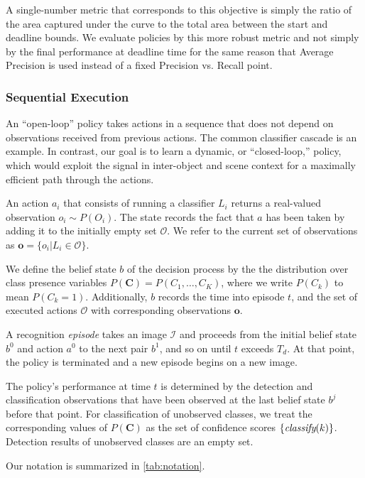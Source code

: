 A single-number metric that corresponds to this objective is simply the ratio of the area captured under the curve to the total area between the start and deadline bounds.
We evaluate policies by this more robust metric and not simply by the final performance at deadline time for the same reason that Average Precision is used instead of a fixed Precision vs. Recall point.

\subsubsection{Sequential Execution}
An ``open-loop'' policy takes actions in a sequence that does not depend on observations received from previous actions.
The common classifier cascade \cite{Viola2001} is an example.
In contrast, our goal is to learn a dynamic, or ``closed-loop,'' policy, which would exploit the signal in inter-object and scene context for a maximally efficient path through the actions.

An action $a_i$ that consists of running a classifier $L_i$ returns a real-valued observation $o_i \sim P(O_i)$.
The state records the fact that $a$ has been taken by adding it to the initially empty set $\mathcal{O}$.
We refer to the current set of observations as $\mathbf{o} = \{o_i | L_i \in \mathcal{O}\}$.

We define the belief state $b$ of the decision process by the the distribution over class presence variables $P(\mathbf{C}) = P(C_1, \dots, C_K)$, where we write $P(C_k)$ to mean $P(C_k=1)$.
Additionally, $b$ records the time into episode $t$, and the set of executed actions $\mathcal{O}$ with corresponding observations $\mathbf{o}$.

A recognition \emph{episode} takes an image $\mathcal{I}$ and proceeds from the initial belief state $b^0$ and action $a^0$ to the next pair $b^1$, and so on until $t$ exceeds $T_d$.
At that point, the policy is terminated and a new episode begins on a new image.

The policy's performance at time $t$ is determined by the detection and classification observations that have been observed at the last belief state $b^j$ before that point.
For classification of unobserved classes, we treat the corresponding values of $P(\mathbf{C})$ as the set of confidence scores $\{\emph{classify}(k)\}$.
Detection results of unobserved classes are an empty set.

Our notation is summarized in \autoref{tab:notation}.

